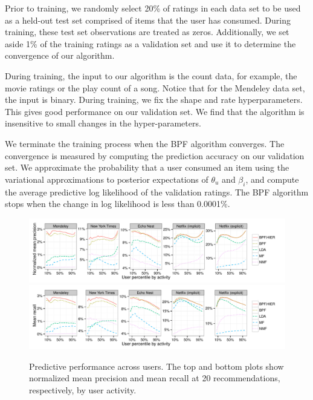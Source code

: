 Prior to training, we randomly select 20\% of ratings in each data set
to be used as a held-out test set comprised of items that the user
has consumed. During training, these test set observations are treated
as zeros. Additionally, we set aside 1\% of the training ratings as a
validation set and use it to determine the convergence of our
algorithm.

During training, the input to our algorithm is the count data, for
example, the movie ratings or the play count of a song. Notice that
for the Mendeley data set, the input is binary. During training, we
fix the shape and rate hyperparameters. This gives good performance on
our validation set. We find that the algorithm is insensitive to small
changes in the hyper-parameters.


We terminate the training process when the BPF algorithm
converges. The convergence is measured by computing the prediction
accuracy on our validation set. We approximate the probability that a
user consumed an item using the variational approximations to
posterior expectations of $\theta_u$ and $\beta_i$, and compute the
average predictive log likelihood of the validation ratings. The BPF
algorithm stops when the change in log likelihood is less than
0.0001\%.

\begin{figure}[t!]
\centering
\includegraphics[width=\textwidth]{figures/mean_precision_at_20_by_user_percentile.pdf}\\
\includegraphics[width=\textwidth]{figures/mean_recall_at_20_by_user_percentile.pdf}\\
\caption{Predictive performance across users. The top and bottom plots
  show normalized mean precision and mean recall at 20
  recommendations, respectively, by user activity.}
\label{fig:precision_recall_by_user_activity}
\end{figure}


